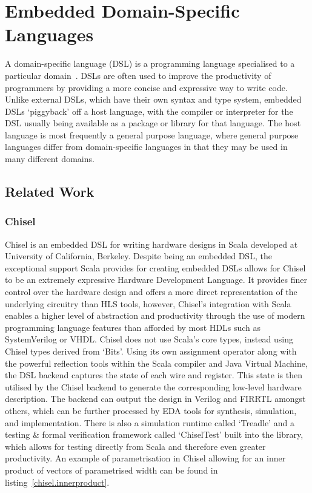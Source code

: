 \section{Embedded Domain-Specific Languages}\label{edsl}
A domain-specific language (DSL) is a programming language specialised to a particular domain \cite{CACCIAGRANO2020100020}. DSLs are often used to improve the productivity of programmers by providing a more concise and expressive way to write code. Unlike external DSLs, which have their own syntax and type system, embedded DSLs `piggyback' off a host language, with the compiler or interpreter for the DSL usually being available as a package or library for that language. The host language is most frequently a general purpose language, where general purpose languages differ from domain-specific languages in that they may be used in many different domains.

\subsection{Related Work}
\subsubsection{Chisel}
Chisel is an embedded DSL for writing hardware designs in Scala developed at University of California, Berkeley. Despite being an embedded DSL, the exceptional support Scala provides for creating embedded DSLs allows for Chisel to be an extremely expressive Hardware Development Language. It provides finer control over the hardware design and offers a more direct representation of the underlying circuitry than HLS tools, however, Chisel's integration with Scala enables a higher level of abstraction and productivity through the use of modern programming language features than afforded by most HDLs such as SystemVerilog or VHDL. Chisel does not use Scala's core types, instead using Chisel types derived from `Bits'. Using its own assignment operator along with the powerful reflection tools within the Scala compiler and Java Virtual Machine, the DSL backend captures the state of each wire and register. This state is then utilised by the Chisel backend to generate the corresponding low-level hardware description. The backend can output the design in Verilog and FIRRTL amongst others, which can be further processed by EDA tools for synthesis, simulation, and implementation. There is also a simulation runtime called `Treadle' and a testing \& formal verification framework called `ChiselTest' built into the library, which allows for testing directly from Scala and therefore even greater productivity. An example of parametrisation in Chisel allowing for an inner product of vectors of parametrised width can be found in listing \ref{chisel.innerproduct}.

